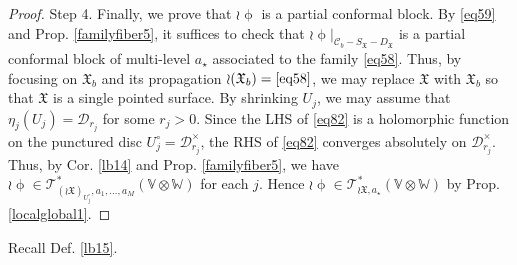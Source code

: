\documentclass[11pt,b5paper,notitlepage]{article}
\theoremstyle{definition}
\newtheorem{rem}[df]{Remark}
\theoremstyle{plain}
\newcommand{\fk}{\mathfrak}
\newcommand{\mc}{\mathcal}
\newcommand{\SV}{\mathscr{V}}
\newcommand{\scr}{\mathscr}
\newcommand{\SX}{{S_{\fk X}}}
\newcommand{\DX}{D_{\fk X}}
\newcommand{\blt}{\bullet}
\newcommand{\Vbb}{\mathbb V}
\newcommand{\Wbb}{\mathbb W}
\newcommand{\Cbb}{\mathbb C}
\newcommand{\<}{\left\langle}
\renewcommand{\>}{\right\rangle}
\newcommand{\MO}{\mathcal{O}}
\newcommand{\MC}{\mathcal{C}}
\newcommand{\fx}{\mathfrak{X}}
\newcommand{\SW}{\mathscr{W}}
\newcommand{\MD}{\mathcal{D}}
\numberwithin{equation}{subsection}
\begin{document}
\begin{proof}
Step 4. Finally, we prove that $\wr \upphi$ is a partial conformal block. By \eqref{eq59} and Prop. \ref{familyfiber5}, it suffices to check that $\wr\upphi|_{\mc C_b-\SX-\DX}$ is a partial conformal block of multi-level $a_\star$ associated to the family \eqref{eq58}. Thus, by focusing on $\fk X_b$ and its propagation $\wr(\fk X_b)=\eqref{eq58}$, we may replace $\fk X$ with $\fk X_b$ so that $\fk X$ is a single pointed surface. By  shrinking $U_j$, we may assume that $\eta_j(U_j)=\MD_{r_j}$ for some $r_j>0$. Since the LHS of \eqref{eq82} is a holomorphic function on the punctured disc $U_j^\circ=\mc D_{r_j}^\times$, the RHS of \eqref{eq82} converges absolutely on $\mc D_{r_j}^\times$. Thus, by Cor. \ref{lb14} and Prop. \ref{familyfiber5}, we have $\wr\upphi\in\scr T_{(\wr{\fk X})_{U_j^\circ},a_1,\dots,a_M}^*(\Vbb\otimes\Wbb)$ for each $j$. Hence $\wr\upphi\in\scr T_{\wr{\fk X},a_\star}^*(\Vbb\otimes\Wbb)$ by Prop. \ref{localglobal1}.
\end{proof}



\begin{comment}
\begin{rem}\label{anotherversionpropagation}
    From the proof of (2), we actually find a global section $s\in H^0\big(\MC,(\SV_{\fx,a_1,\cdots,a_M}^{\leq k})^\vee(\blt S_\fx)\big)$. If we restrict $s$ to $\MC-S_\fx$, then $s$ defines an $\MO_{\MC-S_\fx}$-module morphism $\SV_{\fx,a_1,\cdots,a_M}^{\leq k}\otimes w\rightarrow \MO_{\MC-S_\fx}$. In this way, we actually get an $\MO_{\MC-S_\fx}$-module morphism
    $$
    \wr\upphi:\SV_{\fx,a_1,\cdots,a_M}\vert_{\MC-S_\fx}\otimes_\Cbb \SW_\fx(\Wbb)\rightarrow \MO_{\MC-S_\fx},
    $$
    which satisfies (\ref{eq82}). Its restriction to $\MC-S_\fx-D_\fx$ is the usual propagation given in Thm. \ref{lb71}. This version of propagation is sometimes more useful than that in Thm. \ref{lb71}.
\end{rem}
\end{comment}


Recall Def. \ref{lb15}.
\end{document}
